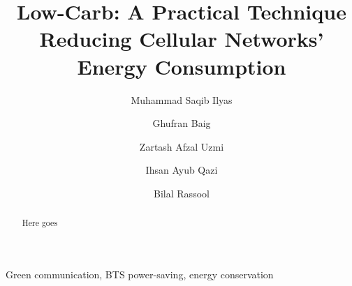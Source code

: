 \documentclass[preprint,12pt]{elsarticle}
\begin{document}
\begin{frontmatter}



\title{Low-Carb: A Practical Technique Reducing Cellular Networks' Energy Consumption}


\author[LUMS]{Muhammad Saqib Ilyas}
\author[LUMS]{Ghufran Baig}
\author[LUMS]{Zartash Afzal Uzmi}
\author[LUMS]{Ihsan Ayub Qazi}
\author[WaridTel]{Bilal Rassool}
\address[LUMS]{School of Science and Engineering, LUMS, Lahore, Pakistan}
\address[WaridTel]{Warid Telecom, Lahore, Pakistan}



\begin{abstract}
Here goes

\end{abstract}

\begin{keyword}

Green communication, BTS power-saving, energy conservation
\end{keyword}

\end{frontmatter}








\end{document}

